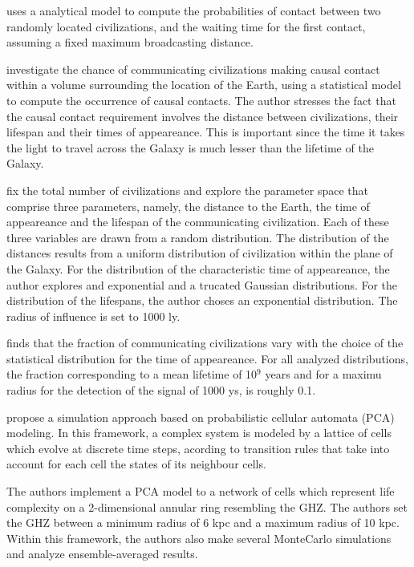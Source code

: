 \documentclass[crop]{CSLB}
\begin{document}
\citet{smith_broadcasting_2009} uses a analytical model to compute the
probabilities of contact between two randomly located civilizations,
and the waiting time for the first contact, assuming a fixed maximum
broadcasting distance.
 
\citet{balbi_impact_2018} investigate the chance of communicating
civilizations making causal contact within a volume surrounding the
location of the Earth, using a statistical model to compute the
occurrence of causal contacts. The author stresses the fact that the
causal contact requirement involves the distance between
civilizations, their lifespan and their times of appeareance.  This is
important since the time it takes the light to travel across the
Galaxy is much lesser than the lifetime of the Galaxy.

\citet{balbi_impact_2018} fix the total number of civilizations and
explore the parameter space that comprise three parameters, namely,
the distance to the Earth, the time of appeareance and the lifespan of
the communicating civilization. Each of these three variables are
drawn from a random distribution. The distribution of the distances
results from a uniform distribution of civilization within the plane
of the Galaxy. For the distribution of the characteristic time of
appeareance, the author explores and exponential and a trucated
Gaussian distributions. For the distribution of the lifespans, the
author choses an exponential distribution. The radius of influence is
set to 1000 ly.

\citet{balbi_impact_2018} finds that the fraction of communicating
civilizations vary with the choice of the statistical distribution for
the time of appeareance. For all analyzed distributions, the fraction
corresponding to a mean lifetime of 10$^9$ years and for a maximu
radius for the detection of the signal of 1000 ys, is roughly 0.1.

\citet{vukotic_astrobiological_2012} propose a simulation approach
based on probabilistic cellular automata (PCA) modeling. In this
framework, a complex system is modeled by a lattice of cells which
evolve at discrete time steps, acording to transition rules that take
into account for each cell the states of its neighbour cells.

The authors implement a PCA model to a network of cells which
represent life complexity on a 2-dimensional annular ring resembling
the GHZ. The authors set the GHZ between a minimum radius of 6 kpc and
a maximum radius of 10 kpc. Within this framework, the authors also
make several MonteCarlo simulations and analyze ensemble-averaged
results.
\end{document}

